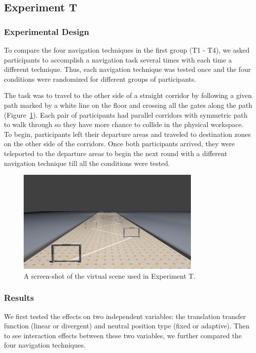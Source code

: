 \subsection{Experiment T}
\subsubsection{Experimental Design}
To compare the four navigation techniques in the first group (T1 - T4), we asked participants to accomplish a navigation task several times with each time a different technique. Thus, each navigation technique was tested once and the four conditions were randomized for different groups of participants.

The task was to travel to the other side of a straight corridor by following a given path marked by a white line on the floor and crossing all the gates along the path (Figure~\ref{fig:4_task1}). Each pair of participants had parallel corridors with symmetric path to walk through so they have more chance to collide in the physical workspace. To begin, participants left their departure areas and traveled to destination zones on the other side of the corridors. Once both participants arrived, they were teleported to the departure areas to begin the next round with a different navigation technique till all the conditions were tested.

\begin{figure}[htb]
  \centering
  \includegraphics[width=0.8\textwidth]{figures/ch4/t1}
  \caption{\label{fig:4_task1}A screen-shot of the virtual scene used in Experiment T.}
\end{figure}

\subsubsection{Results}
We first tested the effects on two independent variables: the translation transfer function (linear or divergent) and neutral position type (fixed or adaptive). Then to see interaction effects between these two variables, we further compared the four navigation techniques.

